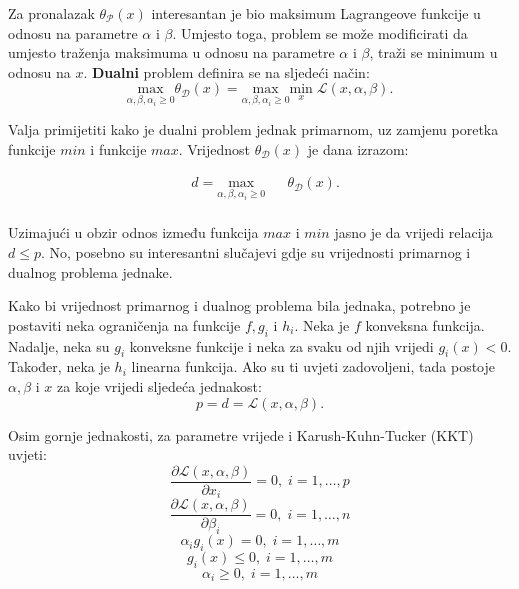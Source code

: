 \documentclass[times, utf8, zavrsni, numeric]{fer}
\begin{document}
\par Za pronalazak $\theta_\mathcal{P}(x)$ interesantan je bio maksimum Lagrangeove funkcije u odnosu na 
parametre $\alpha$ i $\beta$.
Umjesto toga, problem se može modificirati da umjesto traženja maksimuma u odnosu na parametre $\alpha$ i $\beta$,
traži se minimum u odnosu na $x$. 
\textbf{Dualni} problem definira se na sljedeći način:
\begin{equation}
\underset{\alpha, \beta, \alpha_i \geq 0}{\text{max}} \theta_\mathcal{D}(x) = 
\underset{\alpha, \beta, \alpha_i \geq 0}{\text{max}} \underset{x}{\text{min}} \; \mathcal{L}(x, \alpha, \beta).
\end{equation}

\par Valja primijetiti kako je dualni problem jednak primarnom, uz zamjenu poretka funkcije $min$ i funkcije $max$.
Vrijednost $\theta_\mathcal{D}(x)$ je dana izrazom:

\begin{equation}
\begin{aligned}
& d = \underset{\alpha, \beta, \alpha_i \geq 0}{\text{max}}
& & \theta_\mathcal{D}(x).\\
\end{aligned}
\end{equation}

Uzimajući u obzir odnos između funkcija $max$ i $min$ jasno je da vrijedi relacija $d \leq p$.
No, posebno su interesantni slučajevi gdje su vrijednosti primarnog i dualnog problema jednake.

\par Kako bi vrijednost primarnog i dualnog problema bila jednaka, potrebno je postaviti neka ograničenja
na funkcije $f, g_i$ i $h_i$. Neka je $f$ konveksna funkcija. Nadalje, neka su $g_i$ konveksne funkcije 
i neka za svaku od njih vrijedi $g_i(x) < 0$. 
Također, neka je $h_i$ linearna funkcija. 
Ako su ti uvjeti zadovoljeni, tada postoje $\alpha, \beta$ i $x$ za koje vrijedi sljedeća jednakost: 
\begin{equation}
  p = d = \mathcal{L}(x, \alpha, \beta).
\end{equation}

Osim gornje jednakosti, za parametre vrijede i Karush-Kuhn-Tucker (KKT) uvjeti:
\begin{equation}
  \frac{\partial \mathcal{L}(x, \alpha, \beta)}{\partial x_i} = 0, \; i = 1, \ldots, p
\end{equation}
\begin{equation}
  \frac{\partial \mathcal{L}(x, \alpha, \beta)}{\partial \beta_i} = 0, \; i = 1, \ldots, n
\end{equation}
\begin{equation}
  \alpha_ig_i(x) = 0, \; i = 1, \ldots, m
  \label{eq:inter}
\end{equation}
\begin{equation}
  g_i(x) \leq 0, \; i = 1, \ldots, m
\end{equation}
\begin{equation}
  \alpha_i \geq 0, \; i = 1, \ldots, m
\end{equation}
\end{document}
